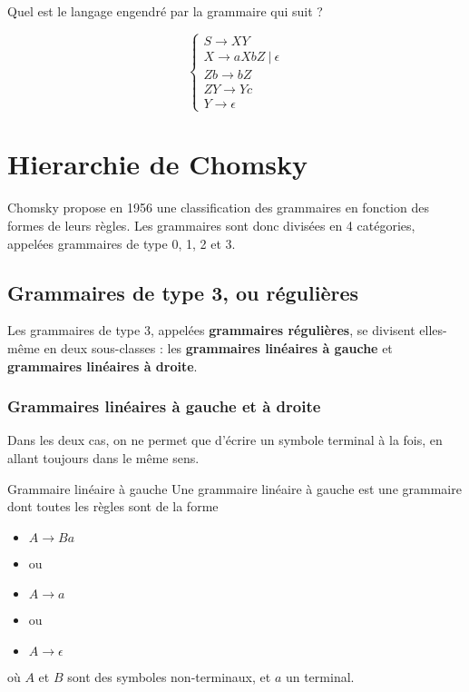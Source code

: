 \begin{exercice}
\label{grammanbncn}
Quel est le langage engendré par la grammaire qui suit ?

\[
\begin{cases}
S \rightarrow XY \\
X \rightarrow aXbZ~|~\epsilon\\
Zb \rightarrow bZ \\
ZY \rightarrow Yc \\
Y \rightarrow \epsilon
\end{cases}
\]
\end{exercice}

\section{Hierarchie de Chomsky}

Chomsky propose en 1956 une classification des grammaires en fonction des formes de leurs règles. Les grammaires sont donc divisées en 4 catégories, appelées grammaires de type 0, 1, 2 et 3.

\subsection{Grammaires de type 3, ou régulières}

Les grammaires de type 3, appelées \textbf{grammaires régulières}, se divisent elles-même en deux sous-classes : les \textbf{grammaires linéaires à gauche} et \textbf{grammaires linéaires à droite}.

\subsubsection{Grammaires linéaires à gauche et à droite}

Dans les deux cas, on ne permet que d'écrire un symbole terminal à la fois, en allant toujours dans le même sens.

\begin{definition}{Grammaire linéaire à gauche}{}
Une grammaire linéaire à gauche est une grammaire dont toutes les règles sont de la forme 
\begin{itemize}
\item[] $A \rightarrow Ba$
\item[] ou
\item[] $A \rightarrow a$
\item[] ou
\item[] $A \rightarrow \epsilon$
\end{itemize}

où $A$ et $B$ sont des symboles non-terminaux, et $a$ un terminal.
\end{definition}

